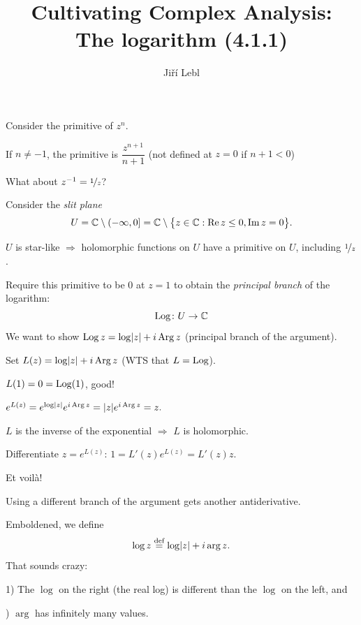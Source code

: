 \documentclass[10pt,aspectratio=169]{beamer}
\author{Ji\v{r}\'i Lebl}
\institute[OSU]{%
Departemento pri Matematiko de Oklahoma {\^S}tata Universitato}
\title{Cultivating Complex Analysis:\\%
The logarithm (4.1.1)}
\date{}
\begin{document}
\begin{frame}
\titlepage
\end{frame}

\begin{frame}
Consider the primitive of $z^n$.

\medskip
\pause

If $n\not=-1$, the primitive is 
$\dfrac{z^{n+1}}{n+1}$ (not defined at $z=0$ if $n+1 < 0$)

\medskip
\pause

What about $z^{-1} = \nicefrac{1}{z}$?

\medskip
\pause

Consider the \emph{slit plane}
\[
U = {\mathbb{C}} \setminus (-\infty,0] = {\mathbb{C}} \setminus \bigl\{ z \in {\mathbb{C}} : \operatorname{Re} z \leq 0 , \operatorname{Im} z = 0 \bigr\}.
\]

\pause

$U$ is star-like $\Rightarrow$ holomorphic functions on $U$ have a primitive on
$U$, including $\nicefrac{1}{z}$.

\medskip
\pause

Require this primitive to be $0$ at $z=1$ to obtain
the \emph{principal branch} of the logarithm:
\[
\operatorname{Log} \colon U \to {\mathbb{C}} 
\]
\pause
We want to show $\operatorname{Log} z = \log \lvert {z} \rvert + i \operatorname{Arg} z$ (principal branch of the argument).
\end{frame}

\begin{frame}
Set $L(z) = \log \lvert {z} \rvert + i \operatorname{Arg} z$ \qquad (WTS that $L = \operatorname{Log}$).

\medskip
\pause

$L(1) = 0 = \operatorname{Log}(1)$, good!

\medskip
\pause

$
e^{L(z)}
=
e^{\log \lvert {z} \rvert} e^{i \operatorname{Arg} z}
=
\lvert {z} \rvert e^{i \operatorname{Arg} z} = z .
$

\pause
\medskip

$L$ is the inverse of the exponential \quad $\Rightarrow$ \quad $L$ is holomorphic.

\medskip
\pause
Differentiate $z = e^{L(z)}$:
\qquad
\pause
$
1 = L'(z) e^{L(z)} = L'(z) z .
$

\medskip
\pause
Et voil\`a!

\medskip
\pause

Using a different branch of the argument gets another antiderivative.

\medskip
\pause

Emboldened, we define
\[
\log z \overset{\text{def}}{=} \log \lvert {z} \rvert + i \arg z .
\]
\pause
That sounds crazy: \pause

1) The $\log$ on the right (the real log) is different than the $\log$ on
the left, and

) $\arg$ has infinitely many values.
\end{frame}
\end{document}
